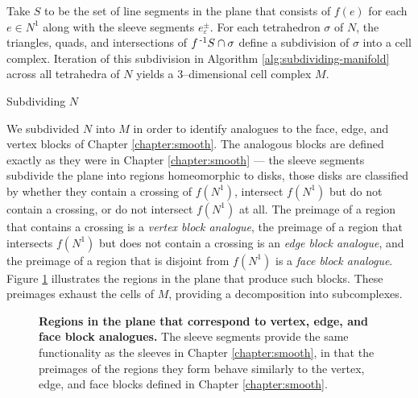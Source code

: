 Take $S$ to be the set of line segments in the plane that consists of $f(e)$ for each $e\in N^1$ along with the sleeve segments $e_\varepsilon^\pm$.
For each tetrahedron $\sigma$ of $N$, the triangles, quads, and intersections of $f^{\,\text{-}1} S\cap\sigma$ define a subdivision of $\sigma$ into a cell complex.
Iteration of this subdivision in Algorithm \ref{alg:subdividing-manifold} across all tetrahedra of $N$ yields a 3--dimensional cell complex $M$.

\begin{algorithm}[h!]
	\caption{Subdividing $N$}
	\label{alg:subdividing-manifold}
\end{algorithm}

We subdivided $N$ into $M$ in order to identify analogues to the face, edge, and vertex blocks of Chapter \ref{chapter:smooth}.
The analogous blocks are defined exactly as they were in Chapter \ref{chapter:smooth} --- the sleeve segments subdivide the plane into regions homeomorphic to disks, those disks are classified by whether they contain a crossing of $f(N^1)$, intersect $f(N^1)$ but do not contain a crossing, or do not intersect $f(N^1)$ at all.
The preimage of a region that contains a crossing is a \emph{vertex block analogue}, the preimage of a region that intersects $f(N^1)$ but does not contain a crossing is an \emph{edge block analogue}, and the preimage of a region that is disjoint from $f(N^1)$ is a \emph{face block analogue}.
Figure \ref{fig:pl-regions} illustrates the regions in the plane that produce such blocks.
These preimages exhaust the cells of $M$, providing a decomposition into subcomplexes.


\begin{figure}[h!]
	\caption{
		\textbf{Regions in the plane that correspond to vertex, edge, and face block analogues.}
		The sleeve segments provide the same functionality as the sleeves in Chapter \ref{chapter:smooth}, in that the preimages of the regions they form behave similarly to the vertex, edge, and face blocks defined in Chapter \ref{chapter:smooth}.
	}
	\label{fig:pl-regions}
\end{figure}

